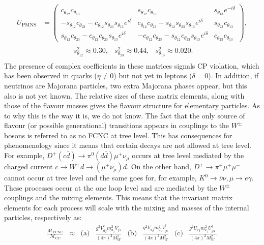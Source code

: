 \documentclass[relqm.tex]{subfiles}
\begin{document}
\begin{align}
    \begin{split}
        U_{\text{PMNS}} &= \begin{pmatrix} c_{\theta_{12}}c_{\theta_{13}} & s_{\theta_{12}}c_{\theta_{13}} & s_{\theta_{13}}e^{-i\delta} \\ -s_{\theta_{12}}c_{\theta_{23}}-c_{\theta_{12}}s_{\theta_{23}}s_{\theta_{13}}e^{i\delta} & c_{\theta_{12}}c_{\theta_{23}}-s_{\theta_{12}}s_{\theta_{23}}s_{\theta_{13}}e^{i\delta} & s_{\theta_{23}}c_{\theta_{13}} \\ s_{\theta_{12}}c_{\theta_{23}}-c_{\theta_{12}}c_{\theta_{23}}s_{\theta_{13}}e^{i\delta} & -c_{\theta_{12}}c_{\theta_{23}}-s_{\theta_{12}}c_{\theta_{23}}s_{\theta_{13}}e^{i\delta} & c_{\theta_{23}}c_{\theta_{13}} \end{pmatrix}, \\
                        &\qquad\qquad \begin{matrix} s_{\theta_{12}}^2 \approx 0.30, & s_{\theta_{23}}^2 \approx 0.44, & s_{\theta_{13}}^2 \approx 0.020. \end{matrix}
    \end{split}
\end{align}
The presence of complex coefficients in these matrices signals CP violation, which has been observed in quarks ($\eta\neq0$) but not yet in leptons ($\delta=0$).
In addition, if neutrinos are Majorana particles, two extra Majorana phases appear, but this also is not yet known. 
The relative sizes of these matrix elements, along with those of the flavour masses gives the flavour structure for elementary particles. 
As to why this is the way it is, we do not know. 
The fact that the only source of flavour (or possible generational) transitions appears in couplings to the $W^\pm$ bosons is referred to as no FCNC at tree level. 
This has consequences for phenomenology since it means that certain decays are not allowed at tree level. 
For example, $D^+(c\bar{d})\to\pi^0(d\bar{d})\mu^+\nu_\mu$ occurs at tree level mediated by the charged current $c\to W^+d\to(\mu^+\nu_\mu)d$.
On the other hand, $D^+\to\pi^+\mu^+\mu^-$ cannot occur at tree level and the same goes for, for example, $K^0\to\bar{\nu}\nu,\mu\to e\gamma$.
These processes occur at the one loop level and are mediated by the $W^\pm$ couplings and the mixing elements. 
This means that the invariant matrix elements for each process will scale with the mixing and masses of the internal particles, respectively as:
\begin{align}
    \frac{\mathcal{M}_{\text{FCNC}}}{\mathcal{M}_{\text{CC}}}&\approx & \text{(a)}&\frac{g^2V_{dj}^\dagger m_{u_j}^2V_{js}}{(4\pi)^2M_W^2} & \text{(b)}&\frac{g^2V_{uj}m_{d_j}^2V_{jc}^\dagger}{(4\pi)^2M_W^2} & \text{(c)}&\frac{g^2U_{ej}m_{\nu_j}^2U_{ju}^\dagger}{(4\pi)^2M_W^2}.
\end{align}
\end{document}

